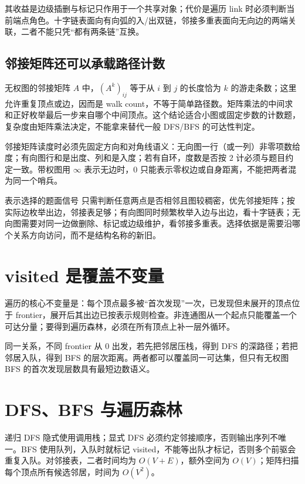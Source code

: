 \documentclass[UTF8,fontset=none,11pt,a4paper]{ctexart}
\begin{document}
其收益是边级插删与标记只作用于一个共享对象；代价是遍历 link 时必须判断当前端点角色。十字链表面向有向弧的入/出双链，邻接多重表面向无向边的两端关联，二者不能只凭“都有两条链”互换。

\subsection{邻接矩阵还可以承载路径计数}
无权图的邻接矩阵 $A$ 中，$(A^k)_{ij}$ 等于从 $i$ 到 $j$ 的长度恰为 $k$ 的游走条数；这里允许重复顶点或边，因而是 walk count，不等于简单路径数。矩阵乘法的中间求和正好枚举最后一步来自哪个中间顶点。这个结论适合小图或固定步数的计数题，复杂度由矩阵乘法决定，不能拿来替代一般 DFS/BFS 的可达性判定。

邻接矩阵读度时必须先固定方向和对角线语义：无向图一行（或一列）非零项数给度；有向图行和是出度、列和是入度；若有自环，度数是否按 $2$ 计必须与题目约定一致。带权图用 $\infty$ 表示无边时，$0$ 只能表示零权边或自身距离，不能把两者混为同一个哨兵。

\begin{methodbox}{表示选择的题面信号}
只需判断任意两点是否相邻且图较稠密，优先邻接矩阵；按实际边枚举出边，邻接表足够；有向图同时频繁枚举入边与出边，看十字链表；无向图需要对同一边做删除、标记或边级维护，看邻接多重表。选择依据是需要沿哪个关系方向访问，而不是结构名称的新旧。
\end{methodbox}

\section{visited 是覆盖不变量}
遍历的核心不变量是：每个顶点最多被“首次发现”一次，已发现但未展开的顶点位于 frontier，展开后其出边已按表示规则检查。非连通图从一个起点只能覆盖一个可达分量；要得到遍历森林，必须在所有顶点上补一层外循环。
\begin{examplebox}{同一关系，不同 frontier}
从 $0$ 出发，若先把邻居压栈，得到 DFS 的深路径；若把邻居入队，得到 BFS 的层次距离。两者都可以覆盖同一可达集，但只有无权图 BFS 的首次发现层数具有最短边数语义。
\end{examplebox}

\section{DFS、BFS 与遍历森林}
递归 DFS 隐式使用调用栈；显式 DFS 必须约定邻接顺序，否则输出序列不唯一。BFS 使用队列，入队时就标记 visited，不能等出队才标记，否则多个前驱会重复入队。对邻接表，二者时间均为 $O(V+E)$，额外空间为 $O(V)$；矩阵扫描每个顶点所有候选邻居，时间为 $O(V^2)$。
\end{document}
